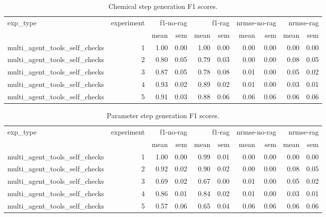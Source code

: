 \documentclass[sn-nature, twocolumn]{sn-jnl}%
\theoremstyle{thmstyleone}%
\theoremstyle{thmstyletwo}%
\theoremstyle{thmstylethree}%
\begin{document}
\begin{table}[!htb]
\begin{tabular}{lrrrrrrrrr}
\toprule
exp\_type & experiment & \multicolumn{2}{r}{f1-no-rag} & \multicolumn{2}{r}{f1-rag} & \multicolumn{2}{r}{nrmse-no-rag} & \multicolumn{2}{r}{nrmse-rag} \\
 &  & mean & sem & mean & sem & mean & sem & mean & sem \\
\midrule
multi\_agent\_tools\_self\_checks & 1 & 1.00 & 0.00 & 1.00 & 0.00 & 0.00 & 0.00 & 0.00 & 0.00 \\
multi\_agent\_tools\_self\_checks & 2 & 0.80 & 0.05 & 0.79 & 0.03 & 0.00 & 0.00 & 0.08 & 0.05 \\
multi\_agent\_tools\_self\_checks & 3 & 0.87 & 0.05 & 0.78 & 0.08 & 0.01 & 0.00 & 0.05 & 0.02 \\
multi\_agent\_tools\_self\_checks & 4 & 0.93 & 0.02 & 0.89 & 0.02 & 0.01 & 0.00 & 0.03 & 0.01 \\
multi\_agent\_tools\_self\_checks & 5 & 0.91 & 0.03 & 0.88 & 0.06 & 0.06 & 0.06 & 0.06 & 0.06 \\
\bottomrule
\end{tabular}
    \caption{Chemical step generation F1 scores.}
    \label{tab:placeholder}
\end{table}

\begin{table}[!htb]
\begin{tabular}{lrrrrrrrrr}
\toprule
exp\_type & experiment & \multicolumn{2}{r}{f1-no-rag} & \multicolumn{2}{r}{f1-rag} & \multicolumn{2}{r}{nrmse-no-rag} & \multicolumn{2}{r}{nrmse-rag} \\
 &  & mean & sem & mean & sem & mean & sem & mean & sem \\
\midrule
multi\_agent\_tools\_self\_checks & 1 & 1.00 & 0.00 & 0.99 & 0.01 & 0.00 & 0.00 & 0.00 & 0.00 \\
multi\_agent\_tools\_self\_checks & 2 & 0.92 & 0.02 & 0.90 & 0.02 & 0.00 & 0.00 & 0.08 & 0.05 \\
multi\_agent\_tools\_self\_checks & 3 & 0.69 & 0.02 & 0.67 & 0.00 & 0.01 & 0.00 & 0.05 & 0.02 \\
multi\_agent\_tools\_self\_checks & 4 & 0.86 & 0.01 & 0.84 & 0.02 & 0.01 & 0.00 & 0.03 & 0.01 \\
multi\_agent\_tools\_self\_checks & 5 & 0.57 & 0.06 & 0.65 & 0.04 & 0.06 & 0.06 & 0.06 & 0.06 \\
\bottomrule
\end{tabular}
    \caption{Parameter step generation F1 scores.}
    \label{tab:placeholder}
\end{table}
\end{document}
